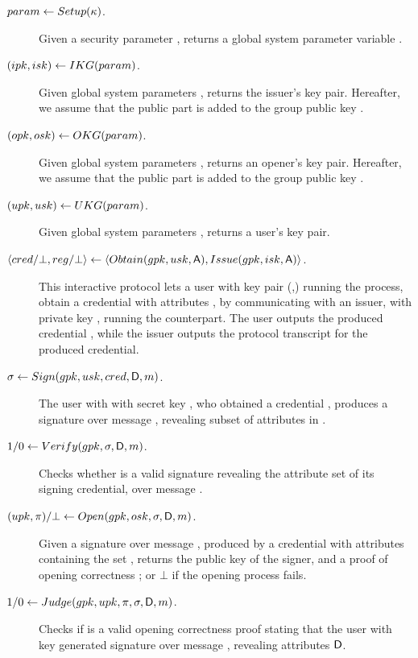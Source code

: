 \begin{description}
\item[$param \gets Setup(\kappa)$.] Given a security parameter \secpar,
  returns a global system parameter variable \parm.
\item[$(ipk,isk) \gets IKG(param)$.] Given global system parameters
  \parm, returns the issuer's key pair. Hereafter, we assume that the public
  part \ipk is added to the group public key \gpk.
\item[$(opk,osk) \gets OKG(param)$.] Given global system parameters
  \parm, returns an opener's key pair. Hereafter, we assume that the public part
  \opk is added to the group public key \gpk.
\item[$(upk,usk) \gets UKG(param)$.] Given global system parameters
  \parm, returns a user's key pair.
\item[$\langle cred/\bot,reg/\bot \rangle \gets
  \langle Obtain(gpk,usk,\mathsf{A}),Issue(gpk,isk,\mathsf{A}) \rangle$.]
  This interactive protocol lets a user with key pair (\upk,\usk) running the
  \Obtain process, obtain a credential \cred with attributes \Attrs, by
  communicating with an issuer, with private key \isk, running the \Issue
  counterpart. The user outputs the produced credential \cred, while the issuer
  outputs the protocol transcript \utrans for the produced credential.
\item[$\sigma \gets Sign(gpk,usk,cred,\mathsf{D},m)$.] The user with
  with secret key \usk, who obtained a credential \cred, produces a signature
  \sig over message \msg, revealing subset of attributes \DAttrs in \cred.
\item[$1/0 \gets Verify(gpk,\sigma,\mathsf{D},m)$.] Checks whether \sig is a
  valid signature revealing the attribute set \DAttrs of its signing credential,
  over message \msg.
\item[$(upk,\pi)/\bot \gets
  Open(gpk,osk,\sigma,\mathsf{D},m)$.]
  Given a signature \sig over message \msg, produced by a credential with
  attributes containing the set \DAttrs, returns the public key \upk of the
  signer, and a proof of opening correctness \oproof; or $\bot$ if the
  opening process fails.
\item[$1/0 \gets Judge(gpk,upk,\pi,\sigma,\mathsf{D},
  m)$.] Checks if \oproof is a valid opening correctness proof stating that
  the user with key \upk generated signature \sig over message \msg, revealing
  attributes $\mathsf{D}$. 
\end{description}

